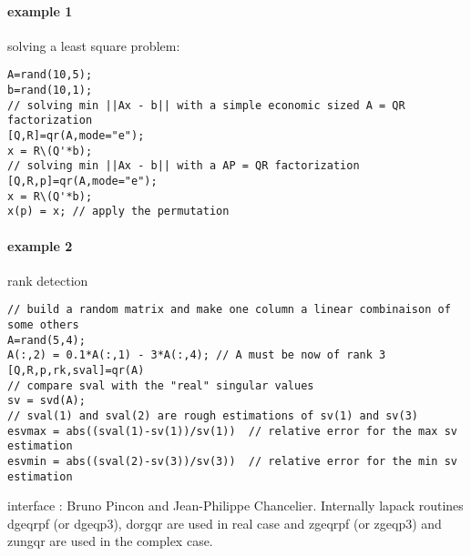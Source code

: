 \begin{examples}
\paragraph{example 1} solving a least square problem:
\begin{Verbatim}
A=rand(10,5);
b=rand(10,1);
// solving min ||Ax - b|| with a simple economic sized A = QR factorization
[Q,R]=qr(A,mode="e");
x = R\(Q'*b);
// solving min ||Ax - b|| with a AP = QR factorization
[Q,R,p]=qr(A,mode="e");
x = R\(Q'*b);
x(p) = x; // apply the permutation
\end{Verbatim}

\paragraph{example 2} rank detection
\begin{Verbatim}
// build a random matrix and make one column a linear combinaison of some others
A=rand(5,4);
A(:,2) = 0.1*A(:,1) - 3*A(:,4); // A must be now of rank 3
[Q,R,p,rk,sval]=qr(A)
// compare sval with the "real" singular values
sv = svd(A);
// sval(1) and sval(2) are rough estimations of sv(1) and sv(3)
esvmax = abs((sval(1)-sv(1))/sv(1))  // relative error for the max sv estimation
esvmin = abs((sval(2)-sv(3))/sv(3))  // relative error for the min sv estimation
\end{Verbatim}

\end{examples}

\begin{manseealso}
\end{manseealso}

\begin{authors}
   interface : Bruno Pincon and Jean-Philippe Chancelier. Internally lapack routines dgeqrpf (or
   dgeqp3), dorgqr are used in real case and zgeqrpf (or zgeqp3) and
   zungqr are used in the complex case.
\end{authors}
